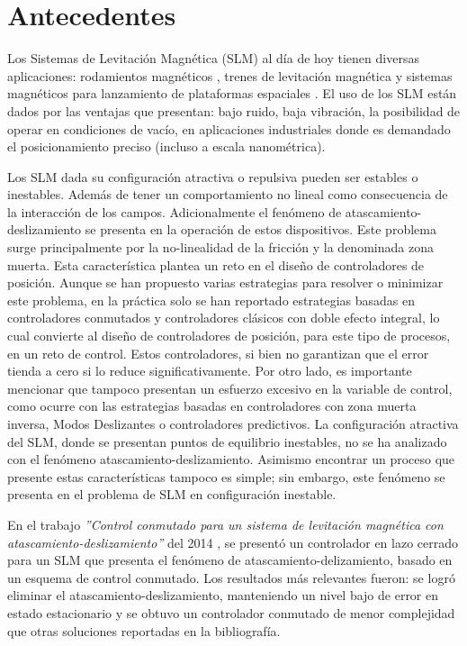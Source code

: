 \chapter{Antecedentes}\label{Chap:Antecedentes}
Los Sistemas de Levitación Magnética (SLM) al día de hoy tienen diversas aplicaciones: rodamientos magnéticos \cite{hung}, trenes de levitación magnética \cite{motoharu} y sistemas magnéticos para lanzamiento de plataformas espaciales \cite{kee}. El uso de los SLM están dados por las ventajas que presentan: bajo ruido, baja vibración, la posibilidad de operar en condiciones de vacío, en aplicaciones industriales donde es demandado el posicionamiento preciso (incluso a escala nanométrica). 

Los SLM dada su configuración atractiva o repulsiva pueden ser estables o inestables. Además de tener un comportamiento no lineal como consecuencia de la interacción de los campos. Adicionalmente el fenómeno de atascamiento-deslizamiento se presenta en la operación de estos dispositivos. Este problema surge principalmente por la no-linealidad de la fricción y la denominada zona muerta. Esta característica plantea un reto en el diseño de controladores de posición. Aunque se han propuesto varias estrategias para resolver o minimizar este problema, en la práctica solo se han reportado estrategias basadas en controladores conmutados y controladores clásicos con doble efecto integral, lo cual convierte al diseño de controladores de posición, para este tipo de procesos, en un reto de control. Estos controladores, si bien no garantizan que el error tienda a cero si lo reduce significativamente. Por otro lado, es importante mencionar que tampoco presentan un esfuerzo excesivo en la variable de control, como ocurre con las estrategias basadas en controladores con zona muerta inversa\cite{rubio}, Modos Deslizantes \cite{yang}\cite{yeh}\cite{bessa} o controladores predictivos\cite{galuppini}. La configuración atractiva del SLM, donde se presentan puntos de equilibrio inestables, no se ha analizado con el fenómeno atascamiento-deslizamiento. Asimismo encontrar un proceso que presente estas características tampoco es simple; sin embargo, este fenómeno se presenta en el problema de SLM en configuración inestable.

En el trabajo \emph{''Control conmutado para un sistema de levitación magnética con atascamiento-deslizamiento''} del 2014 \cite{alcantara}, se presentó un controlador en lazo cerrado para un SLM que presenta el fenómeno de atascamiento-delizamiento, basado en un esquema de control conmutado. Los resultados más relevantes fueron: se logró eliminar el atascamiento-deslizamiento, manteniendo un nivel bajo de error en estado estacionario y se obtuvo un controlador conmutado de menor complejidad que otras soluciones reportadas en la bibliografía.

